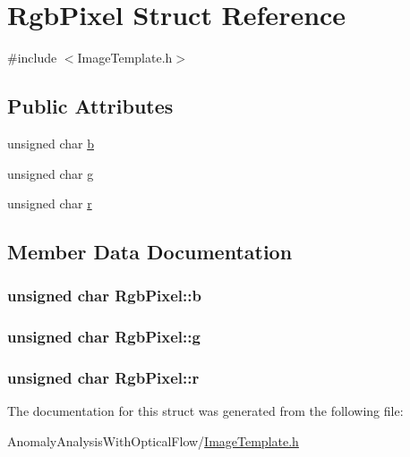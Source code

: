 \hypertarget{struct_rgb_pixel}{\section{Rgb\+Pixel Struct Reference}
\label{struct_rgb_pixel}
}


{\ttfamily \#include $<$Image\+Template.\+h$>$}

\subsection*{Public Attributes}
\begin{DoxyCompactItemize}
\item 
unsigned char \hyperlink{struct_rgb_pixel_aa65983dd3e0f1b29c2d6049117a9c714}{b}
\item 
unsigned char \hyperlink{struct_rgb_pixel_a0d2d7b72a8c38a3059aa17db58170aec}{g}
\item 
unsigned char \hyperlink{struct_rgb_pixel_a159daae2b7f59d4570a144cb43062e96}{r}
\end{DoxyCompactItemize}


\subsection{Member Data Documentation}
\hypertarget{struct_rgb_pixel_aa65983dd3e0f1b29c2d6049117a9c714}{
\subsubsection[{b}]{\setlength{\rightskip}{0pt plus 5cm}unsigned char Rgb\+Pixel\+::b}}\label{struct_rgb_pixel_aa65983dd3e0f1b29c2d6049117a9c714}
\hypertarget{struct_rgb_pixel_a0d2d7b72a8c38a3059aa17db58170aec}{
\subsubsection[{g}]{\setlength{\rightskip}{0pt plus 5cm}unsigned char Rgb\+Pixel\+::g}}\label{struct_rgb_pixel_a0d2d7b72a8c38a3059aa17db58170aec}
\hypertarget{struct_rgb_pixel_a159daae2b7f59d4570a144cb43062e96}{
\subsubsection[{r}]{\setlength{\rightskip}{0pt plus 5cm}unsigned char Rgb\+Pixel\+::r}}\label{struct_rgb_pixel_a159daae2b7f59d4570a144cb43062e96}


The documentation for this struct was generated from the following file\+:\begin{DoxyCompactItemize}
\item 
Anomaly\+Analysis\+With\+Optical\+Flow/\hyperlink{_image_template_8h}{Image\+Template.\+h}\end{DoxyCompactItemize}
